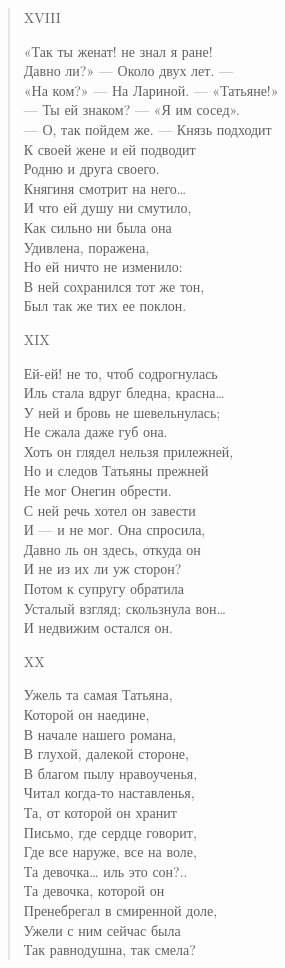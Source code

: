 \begin{verse}
XVIII

«Так ты женат! не знал я ране!\\
Давно ли?» — Около двух лет. —\\
«На ком?» — На Лариной. — «Татьяне!»\\
— Ты ей знаком? — «Я им сосед».\\
— О, так пойдем же. — Князь подходит\\
К своей жене и ей подводит\\
Родню и друга своего.\\
Княгиня смотрит на него…\\
И что ей душу ни смутило,\\
Как сильно ни была она\\
Удивлена, поражена,\\
Но ей ничто не изменило:\\
В ней сохранился тот же тон,\\
Был так же тих ее поклон.

XIX

Ей-ей! не то, чтоб содрогнулась\\
Иль стала вдруг бледна, красна…\\
У ней и бровь не шевельнулась;\\
Не сжала даже губ она.\\
Хоть он глядел нельзя прилежней,\\
Но и следов Татьяны прежней\\
Не мог Онегин обрести.\\
С ней речь хотел он завести\\
И — и не мог. Она спросила,\\
Давно ль он здесь, откуда он\\
И не из их ли уж сторон?\\
Потом к супругу обратила\\
Усталый взгляд; скользнула вон…\\
И недвижим остался он.

XX

Ужель та самая Татьяна,\\
Которой он наедине,\\
В начале нашего романа,\\
В глухой, далекой стороне,\\
В благом пылу нравоученья,\\
Читал когда-то наставленья,\\
Та, от которой он хранит\\
Письмо, где сердце говорит,\\
Где все наруже, все на воле,\\
Та девочка… иль это сон?..\\
Та девочка, которой он\\
Пренебрегал в смиренной доле,\\
Ужели с ним сейчас была\\
Так равнодушна, так смела?


\end{verse}
